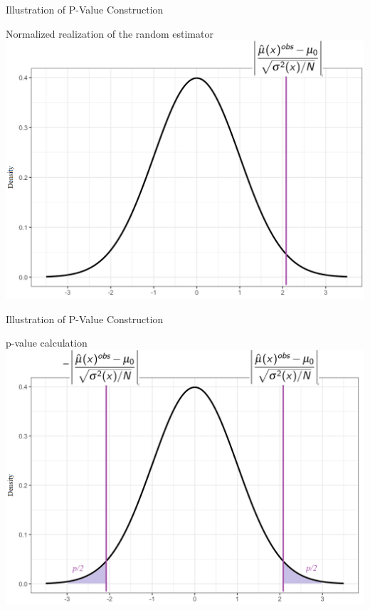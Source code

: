 \documentclass[11pt,english,handout]{beamer}
\begin{document}
\begin{frame}{Illustration of P-Value Construction}
	
	
	\begin{center}
		Normalized realization of the random estimator
		\includegraphics[scale=0.3]{pvalue2.png}
	\end{center}
	
\end{frame}

\begin{frame}{Illustration of P-Value Construction}		
	\begin{center}
		p-value calculation
		\includegraphics[scale=0.3]{pvalue3.png}
	\end{center}
\end{frame}
\end{document}
